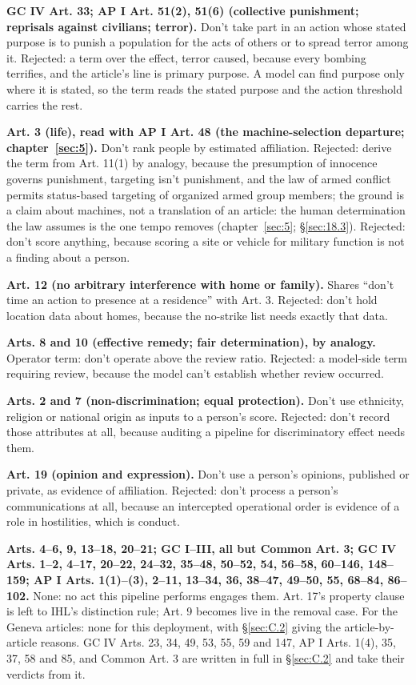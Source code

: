 \textbf{GC IV Art. 33; AP I Art. 51(2), 51(6) (collective punishment; reprisals against civilians; terror).} Don't take part in an action whose stated purpose is to punish a population for the acts of others or to spread terror among it. Rejected: a term over the effect, terror caused, because every bombing terrifies, and the article's line is primary purpose. A model can find purpose only where it is stated, so the term reads the stated purpose and the action threshold carries the rest.

\textbf{Art. 3 (life), read with AP I Art. 48 (the machine-selection departure; chapter~\ref{sec:5}).} Don't rank people by estimated affiliation. Rejected: derive the term from Art. 11(1) by analogy, because the presumption of innocence governs punishment, targeting isn't punishment, and the law of armed conflict permits status-based targeting of organized armed group members; the ground is a claim about machines, not a translation of an article: the human determination the law assumes is the one tempo removes (chapter~\ref{sec:5}; \S\ref{sec:18.3}). Rejected: don't score anything, because scoring a site or vehicle for military function is not a finding about a person.

\textbf{Art. 12 (no arbitrary interference with home or family).} Shares “don't time an action to presence at a residence” with Art. 3. Rejected: don't hold location data about homes, because the no-strike list needs exactly that data.

\textbf{Arts. 8 and 10 (effective remedy; fair determination), by analogy.} Operator term: don't operate above the review ratio. Rejected: a model-side term requiring review, because the model can't establish whether review occurred.

\textbf{Arts. 2 and 7 (non-discrimination; equal protection).} Don't use ethnicity, religion or national origin as inputs to a person's score. Rejected: don't record those attributes at all, because auditing a pipeline for discriminatory effect needs them.

\textbf{Art. 19 (opinion and expression).} Don't use a person's opinions, published or private, as evidence of affiliation. Rejected: don't process a person's communications at all, because an intercepted operational order is evidence of a role in hostilities, which is conduct.

\textbf{Arts. 4–6, 9, 13–18, 20–21; GC I–III, all but Common Art. 3; GC IV Arts. 1–2, 4–17, 20–22, 24–32, 35–48, 50–52, 54, 56–58, 60–146, 148–159; AP I Arts. 1(1)–(3), 2–11, 13–34, 36, 38–47, 49–50, 55, 68–84, 86–102.} None: no act this pipeline performs engages them. Art. 17's property clause is left to IHL's distinction rule; Art. 9 becomes live in the removal case. For the Geneva articles: none for this deployment, with \S\ref{sec:C.2} giving the article-by-article reasons. GC IV Arts. 23, 34, 49, 53, 55, 59 and 147, AP I Arts. 1(4), 35, 37, 58 and 85, and Common Art. 3 are written in full in \S\ref{sec:C.2} and take their verdicts from it.

